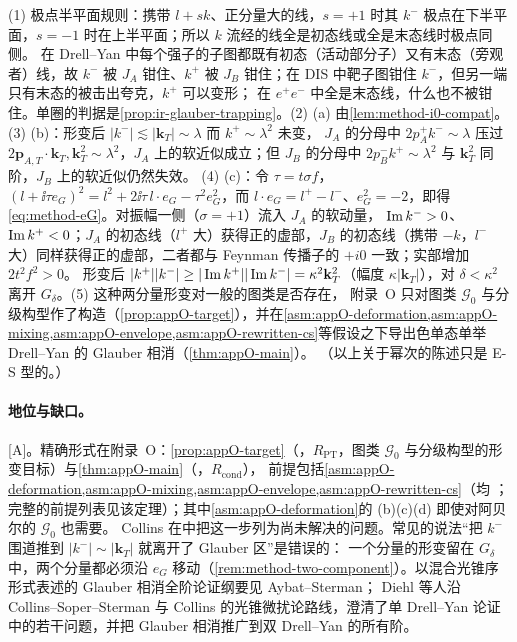 \begin{proofsketch}
(1) 极点半平面规则：携带 $l+sk$、正分量大的线，$s=+1$ 时其 $k^-$ 极点在下半平面，$s=-1$ 时在上半平面；所以 $k$ 流经的线全是初态线或全是末态线时极点同侧。
在 Drell--Yan 中每个强子的子图都既有初态（活动部分子）又有末态（旁观者）线，故 $k^-$ 被 $J_A$ 钳住、$k^+$ 被 $J_B$ 钳住；在 DIS 中靶子图钳住 $k^-$，但另一端只有末态的被击出夸克，$k^+$ 可以变形；
在 $e^+e^-$ 中全是末态线，什么也不被钳住。单圈的判据是\cref{prop:ir-glauber-trapping}。(2) (a) 由\cref{lem:method-i0-compat}。(3) (b)：形变后 $|k^-|\lesssim|\mathbf k_T|\sim\lambda$ 而 $k^+\sim\lambda^2$ 未变，
$J_A$ 的分母中 $2p_A^+k^-\sim\lambda$ 压过 $2\mathbf p_{A,T}\cdot\mathbf k_T,\mathbf k_T^2\sim\lambda^2$，$J_A$ 上的软近似成立；但 $J_B$ 的分母中 $2p_B^-k^+\sim\lambda^2$ 与 $\mathbf k_T^2$ 同阶，$J_B$ 上的软近似仍然失效。
(4) (c)：令 $\tau=t\sigma f$，$(l+\ii\tau e_G)^2=l^2+2\ii\tau\,l\cdot e_G-\tau^2e_G^2$，而 $l\cdot e_G=l^+-l^-$、$e_G^2=-2$，即得\cref{eq:method-eG}。对振幅一侧（$\sigma=+1$）流入 $J_A$ 的软动量，
$\operatorname{Im} k^->0$、$\operatorname{Im} k^+<0$；$J_A$ 的初态线（$l^+$ 大）获得正的虚部，$J_B$ 的初态线（携带 $-k$，$l^-$ 大）同样获得正的虚部，二者都与 Feynman 传播子的 $+i0$ 一致；实部增加 $2t^2f^2>0$。
形变后 $|k^+||k^-|\ge|\operatorname{Im} k^+||\operatorname{Im} k^-|=\kappa^2\mathbf k_T^2$（幅度 $\kappa|\mathbf k_T|$），对 $\delta<\kappa^2$ 离开 $G_\delta$。(5) 这种两分量形变对一般的图类是否存在，
附录~O 只对图类 $\mathcal G_0$ 与分级构型作了构造（\cref{prop:appO-target}），并在\cref{asm:appO-deformation,asm:appO-mixing,asm:appO-envelope,asm:appO-rewritten-cs}等假设之下导出色单态单举 Drell--Yan 的 Glauber 相消（\cref{thm:appO-main}）。
（以上关于幂次的陈述只是 E-S 型的。）
\end{proofsketch}

\paragraph{地位与缺口。}[A]。精确形式在附录~O：\cref{prop:appO-target}（\tagR，$R_{\mathrm{PT}}$，图类 $\mathcal G_0$ 与分级构型的形变目标）与\cref{thm:appO-main}（\tagR，$R_{\mathrm{cond}}$），
前提包括\cref{asm:appO-deformation,asm:appO-mixing,asm:appO-envelope,asm:appO-rewritten-cs}（均 \tagA；完整的前提列表见该定理）；其中\cref{asm:appO-deformation}的 (b)(c)(d) 即使对阿贝尔的 $\mathcal G_0$ 也需要。
Collins 在\cite[第~14.4.8~节]{Collins2011}中把这一步列为尚未解决的问题。常见的说法“把 $k^-$ 围道推到 $|k^-|\sim|\mathbf k_T|$ 就离开了 Glauber 区”是错误的：
一个分量的形变留在 $G_\delta$ 中，两个分量都必须沿 $e_G$ 移动（\cref{rem:method-two-component}）。以混合光锥序形式表述的 Glauber 相消全阶论证纲要见 Aybat--Sterman\cite{AybatSterman2009}；
Diehl 等人\cite{Diehl:2015bca}沿 Collins--Soper--Sterman 与 Collins 的光锥微扰论路线，澄清了单 Drell--Yan 论证中的若干问题，并把 Glauber 相消推广到双 Drell--Yan 的所有阶。

